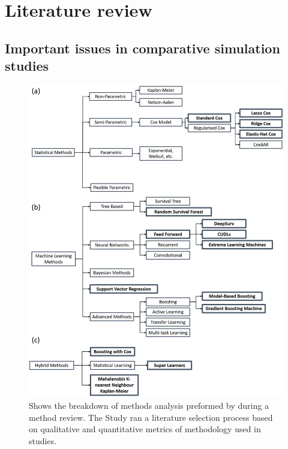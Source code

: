 \section{Literature review}
\subsection{Important issues in comparative simulation studies}

\begin{figure}
	\includegraphics[scale=0.3]{Figures/ML_STATS_MODELS.jpg}
	\caption{Shows the breakdown of methods analysis preformed by \parencite{smith_scoping_2022} during a method review. The Study ran a literature selection process based on qualitative and quantitative metrics of methodology used in studies.}
\end{figure}

